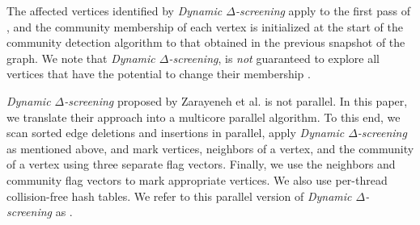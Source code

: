 The affected vertices identified by \textit{Dynamic $\Delta$-screening} apply to the first pass of \Lou{}, and the community membership of each vertex is initialized at the start of the community detection algorithm to that obtained in the previous snapshot of the graph. We note that \textit{Dynamic $\Delta$-screening}, is \textit{not} guaranteed to explore all vertices that have the potential to change their membership \cite{com-zarayeneh21}.

\textit{Dynamic $\Delta$-screening} proposed by Zarayeneh et al. \cite{com-zarayeneh21} is not parallel. In this paper, we translate their approach into a multicore parallel algorithm. To this end, we scan sorted edge deletions and insertions in parallel, apply \textit{Dynamic $\Delta$-screening} as mentioned above, and mark vertices, neighbors of a vertex, and the community of a vertex using three separate flag vectors. Finally, we use the neighbors and community flag vectors to mark appropriate vertices. We also use per-thread collision-free hash tables. We refer to this parallel version of \textit{Dynamic $\Delta$-screening} as \Del{}.
